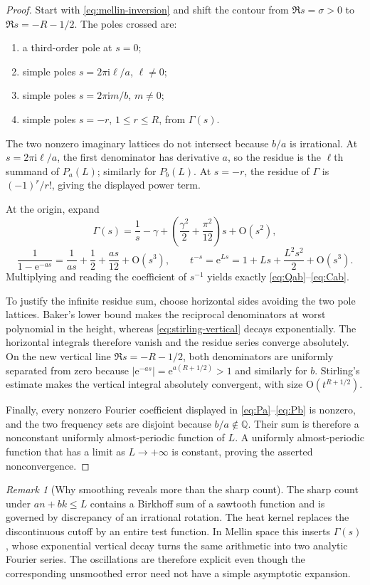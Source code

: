 \documentclass[11pt,oneside]{article}
\theoremstyle{definition}
\theoremstyle{remark}
\newtheorem{remark}[theorem]{Remark}
\newcommand{\Q}{\mathbb Q}
\newcommand{\e}{\mathrm e}
\newcommand{\ii}{\mathrm i}
\newcommand{\bigO}{\mathrm O}
\begin{document}
\begin{proof}
Start with \eqref{eq:mellin-inversion} and shift the contour from $\Re s=\sigma>0$ to $\Re s=-R-1/2$.  The poles crossed are:
\begin{enumerate}
  \item a third-order pole at $s=0$;
  \item simple poles $s=2\pi\ii\ell/a$, $\ell\ne0$;
  \item simple poles $s=2\pi\ii m/b$, $m\ne0$;
  \item simple poles $s=-r$, $1\le r\le R$, from $\Gamma(s)$.
\end{enumerate}
The two nonzero imaginary lattices do not intersect because $b/a$ is irrational.  At $s=2\pi\ii\ell/a$, the first denominator has derivative $a$, so the residue is the $\ell$th summand of $P_a(L)$; similarly for $P_b(L)$.  At $s=-r$, the residue of $\Gamma$ is $(-1)^r/r!$, giving the displayed power term.

At the origin, expand
\[
 \Gamma(s)=\frac1s-\gamma
  +\left(\frac{\gamma^2}{2}+\frac{\pi^2}{12}\right)s+\bigO(s^2),
\]
\[
 \frac1{1-\e^{-as}}=\frac1{as}+\frac12+\frac{as}{12}+\bigO(s^3),
 \qquad
 t^{-s}=\e^{Ls}=1+Ls+\frac{L^2s^2}{2}+\bigO(s^3).
\]
Multiplying and reading the coefficient of $s^{-1}$ yields exactly \eqref{eq:Qab}--\eqref{eq:Cab}.

To justify the infinite residue sum, choose horizontal sides avoiding the two pole lattices.  Baker's lower bound makes the reciprocal denominators at worst polynomial in the height, whereas \eqref{eq:stirling-vertical} decays exponentially.  The horizontal integrals therefore vanish and the residue series converge absolutely.  On the new vertical line $\Re s=-R-1/2$, both denominators are uniformly separated from zero because $|\e^{-as}|=\e^{a(R+1/2)}>1$ and similarly for $b$.  Stirling's estimate makes the vertical integral absolutely convergent, with size $\bigO(t^{R+1/2})$.

Finally, every nonzero Fourier coefficient displayed in \eqref{eq:Pa}--\eqref{eq:Pb} is nonzero, and the two frequency sets are disjoint because $b/a\notin\Q$.  Their sum is therefore a nonconstant uniformly almost-periodic function of $L$.  A uniformly almost-periodic function that has a limit as $L\to+\infty$ is constant, proving the asserted nonconvergence.
\end{proof}

\begin{remark}[Why smoothing reveals more than the sharp count]
The sharp count under $an+bk\le L$ contains a Birkhoff sum of a sawtooth function and is governed by discrepancy of an irrational rotation.  The heat kernel replaces the discontinuous cutoff by an entire test function.  In Mellin space this inserts $\Gamma(s)$, whose exponential vertical decay turns the same arithmetic into two analytic Fourier series.  The oscillations are therefore explicit even though the corresponding unsmoothed error need not have a simple asymptotic expansion.
\end{remark}
\end{document}
